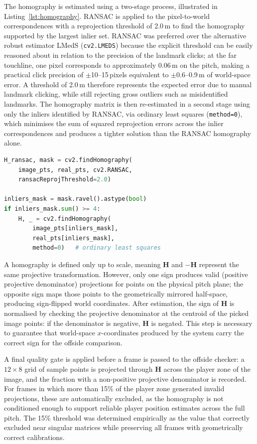 The homography is estimated using a two-stage process, illustrated in Listing~\ref{lst:homography}. RANSAC is applied to the pixel-to-world correspondences with a reprojection threshold of 2.0\,m to find the homography supported by the largest inlier set. RANSAC was preferred over the alternative robust estimator LMedS (\texttt{cv2.LMEDS}) because the explicit threshold can be easily reasoned about in relation to the precision of the landmark clicks; at the far touchline, one pixel corresponds to approximately 0.06\,m on the pitch, making a practical click precision of $\pm$10--15\,pixels equivalent to $\pm$0.6--0.9\,m of world-space error. A threshold of 2.0\,m therefore represents the expected error due to manual landmark clicking, while still rejecting gross outliers such as misidentified landmarks. The homography matrix is then re-estimated in a second stage using only the inliers identified by RANSAC, via ordinary least squares (\texttt{method=0}), which minimises the sum of squared reprojection errors across the inlier correspondences and produces a tighter solution than the RANSAC homography alone.

\begin{lstlisting}[language=Python, caption={Two-pass homography estimation: RANSAC followed by least-squares refit on inliers.}, label={lst:homography}]
H_ransac, mask = cv2.findHomography(
    image_pts, real_pts, cv2.RANSAC,
    ransacReprojThreshold=2.0)

inliers_mask = mask.ravel().astype(bool)
if inliers_mask.sum() >= 4:
    H, _ = cv2.findHomography(
        image_pts[inliers_mask],
        real_pts[inliers_mask],
        method=0)   # ordinary least squares
\end{lstlisting}

A homography is defined only up to scale, meaning $\mathbf{H}$ and $-\mathbf{H}$ represent the same projective transformation. However, only one sign produces valid (positive projective denominator) projections for points on the physical pitch plane; the opposite sign maps those points to the geometrically mirrored half-space, producing sign-flipped world coordinates. After estimation, the sign of $\mathbf{H}$ is normalised by checking the projective denominator at the centroid of the picked image points: if the denominator is negative, $\mathbf{H}$ is negated. This step is necessary to guarantee that world-space $x$-coordinates produced by the system carry the correct sign for the offside comparison.

A final quality gate is applied before a frame is passed to the offside checker: a $12 \times 8$ grid of sample points is projected through $\mathbf{H}$ across the player zone of the image, and the fraction with a non-positive projective denominator is recorded. For frames in which more than 15\% of the player zone generated invalid projections, these are automatically excluded, as the homography is not conditioned enough to support reliable player position estimates across the full pitch. The 15\% threshold was determined empirically as the value that correctly excluded near singular matrices while preserving all frames with geometrically correct calibrations.

